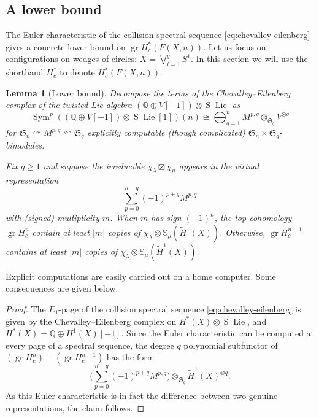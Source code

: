 \documentclass[12pt]{article}
\newcommand{\Q}{\mathbb{Q}}
\newcommand{\SymGroup}[1][n]{\mathfrak{S}_{#1}}
\newcommand{\Specht}[1]{\chi_{#1}}
\newcommand{\Schur}[1]{\mathbb{S}_{#1}}
\DeclareMathOperator{\gr}{gr}
\DeclareMathOperator{\Lie}{Lie}
\DeclareMathOperator{\Suspension}{S}
\DeclareMathOperator{\Sym}{Sym}
\theoremstyle{plain}
\newtheorem{lem}[thm]{Lemma}
\theoremstyle{definition}
\theoremstyle{remark}
\begin{document}
\subsection{A lower bound}\label{sec:lower-bound}

The Euler characteristic of the collision spectral sequence \eqref{eq:chevalley-eilenberg} gives a concrete lower bound on $\gr H^*_c(F(X,n))$. Let us focus on configurations on wedges of circles: $X = \bigvee_{i=1}^g S^1$. In this section we will use the shorthand $H_c^*$ to denote $H_c^*(F(X, n))$. 

\begin{lem}[Lower bound]
    Decompose the terms of the Chevalley--Eilenberg complex of the twisted Lie algebra $(\Q\oplus V[-1])\otimes \Suspension\Lie$ as
    \begin{equation}
    \Sym^p\left((\Q\oplus V[-1])\otimes \Suspension\Lie[1]\right) (n) \cong \bigoplus_{q= 1}^n
    M^{p,q} \otimes_{\SymGroup[q]}V^{\otimes q}
\end{equation}
for $\SymGroup \curvearrowright M^{p,q} \curvearrowleft \SymGroup[q]$ explicitly computable (though complicated) $\SymGroup\times\SymGroup[q]$-bimodules.

Fix $q\geq 1$ and suppose the irreducible $\Specht{\lambda}\boxtimes\Specht{\mu}$ appears in the virtual representation
\[ \sum_{p=0}^{n-q} (-1)^{p+q} M^{p,q}
\]
with (signed) multiplicity $m$. When $m$ has sign $(-1)^n$, the top cohomology $\gr H^n_c$ contain at least $|m|$ copies of $\Specht{\lambda}\otimes\Schur{\mu}(\tilde{H}^1(X))$. Otherwise, $\gr H^{n-1}_c$ contains at least $|m|$ copies of $\Specht{\lambda}\otimes\Schur{\mu}(\tilde{H}^1(X))$.
\end{lem}
Explicit computations are easily carried out on a home computer. Some consequences are given below.
\begin{proof}
    The $E_1$-page of the collision spectral sequence \eqref{eq:chevalley-eilenberg} is given by the Chevalley--Eilenberg complex on $H^*(X)\otimes \Suspension\Lie$, and $H^*(X) = \Q \oplus H^1(X)[-1]$. Since the Euler characteristic can be computed at every page of a spectral sequence, the degree $q$ polynomial subfunctor of  $(\gr H^{n}_c) - (\gr H^{n-1}_c)$ has the form
\begin{equation}\label{eq:alternating sum Mpq}
    \Big(\sum_{p=0}^{n-q} (-1)^{p+q} M^{p,q}\Big)\otimes_{\SymGroup[q]}\tilde{H}^1(X)^{\otimes q}.
\end{equation}
    As this Euler characteristic is in fact the difference between two genuine representations, the claim follows.
\end{proof}
\end{document}
